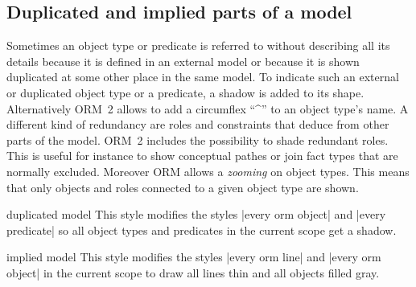 \documentclass[a4paper,10pt]{article}
\begin{document}
\subsection{Duplicated and implied parts of a model}
\label{sec:duplicatedandimplied}
Sometimes an object type or predicate is referred to without describing all its details because it is defined in an external model or because it is shown duplicated at some other place in the same model. To indicate such an external or duplicated object type or a predicate, a shadow is added to its shape. Alternatively ORM~2 allows to add a circumflex ``\^{}'' to an object type's name. A different kind of redundancy are roles and constraints that deduce from other parts of the model. ORM~2 includes the possibility to shade redundant roles. This is useful for instance to show conceptual pathes or join fact types that are normally excluded. Moreover ORM allows a \emph{zooming} on object types. This means that only objects and roles connected to a given object type are shown.

\begin{stylekey}{duplicated model}
This style modifies the styles |every orm object| and |every predicate| so all object types and predicates in the current scope get a shadow.
\begin{codeexample}[]
\end{codeexample}
\end{stylekey} %

\begin{stylekey}{implied model}
  This style modifies the styles |every orm line| and |every orm object| in the current scope to draw all lines thin and all objects filled gray.
\begin{figure}[h]
\centering
\begin{codeexample}[]
\end{codeexample}
\end{figure}
\end{stylekey}
\end{document}
